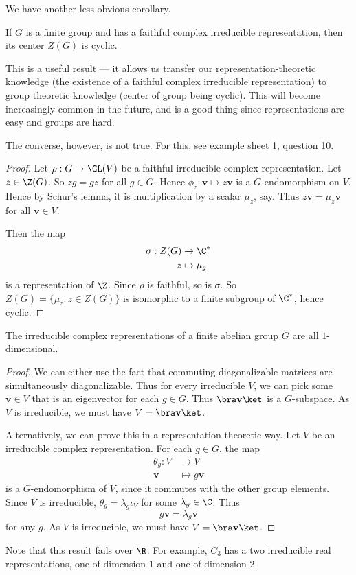 \documentclass[a4paper]{article}
\begin{document}
We have another less obvious corollary.
\begin{cor}
  If $G$ is a finite group and has a faithful complex irreducible representation, then its center $Z(G)$ is cyclic.
\end{cor}
This is a useful result --- it allows us transfer our representation-theoretic knowledge (the existence of a faithful complex irreducible representation) to group theoretic knowledge (center of group being cyclic). This will become increasingly common in the future, and is a good thing since representations are easy and groups are hard.

The converse, however, is not true. For this, see example sheet 1, question 10.
\begin{proof}
  Let $\rho: G \to \GL(V)$ be a faithful irreducible complex representation. Let $z \in \Z(G)$. So $zg = gz$ for all $g \in G$. Hence $\phi_z: \mathbf{v} \mapsto z\mathbf{v}$ is a $G$-endomorphism on $V$. Hence by Schur's lemma, it is multiplication by a scalar $\mu_z$, say. Thus $z\mathbf{v} = \mu_z \mathbf{v}$ for all $\mathbf{v}\in V$.

  Then the map
  \begin{align*}
    \sigma: Z(G) &\to \C^*\\
    z &\mapsto \mu_g
  \end{align*}
  is a representation of $\Z$. Since $\rho$ is faithful, so is $\sigma$. So $Z(G) = \{\mu_z: z \in Z(G)\}$ is isomorphic to a finite subgroup of $\C^*$, hence cyclic.
\end{proof}

\begin{cor}
  The irreducible complex representations of a finite abelian group $G$ are all $1$-dimensional.
\end{cor}

\begin{proof}
  We can either use the fact that commuting diagonalizable matrices are simultaneously diagonalizable. Thus for every irreducible $V$, we can pick some $\mathbf{v} \in V$ that is an eigenvector for each $g \in G$. Thus $\bra \mathbf{v}\ket$ is a $G$-subspace. As $V$ is irreducible, we must have $V = \bra \mathbf{v}\ket$.

  Alternatively, we can prove this in a representation-theoretic way. Let $V$ be an irreducible complex representation. For each $g \in G$, the map
  \begin{align*}
    \theta_g: V &\to V\\
    \mathbf{v} &\mapsto g\mathbf{v}
  \end{align*}
  is a $G$-endomorphism of $V$, since it commutes with the other group elements. Since $V$ is irreducible, $\theta_g = \lambda_g \iota_V$ for some $\lambda_g \in \C$. Thus
  \[
    g\mathbf{v} = \lambda_g \mathbf{v}
  \]
  for any $g$. As $V$ is irreducible, we must have $V = \bra \mathbf{v}\ket$.
\end{proof}
Note that this result fails over $\R$. For example, $C_3$ has a two irreducible real representations, one of dimension $1$ and one of dimension $2$.
\end{document}
